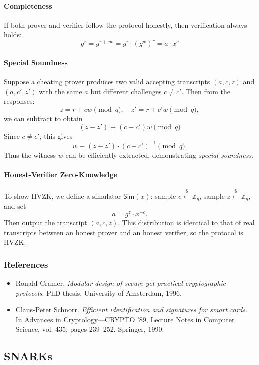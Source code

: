 \paragraph{Completeness}
If both prover and verifier follow the protocol honestly, then verification always holds:
\[
g^z = g^{r + cw} = g^r \cdot (g^w)^c = a \cdot x^c
\]

\paragraph{Special Soundness}
Suppose a cheating prover produces two valid accepting transcripts 
\((a,c,z)\) and \((a,c',z')\) with the same $a$ but different challenges $c \neq c'$.  
Then from the responses:
\[
z = r + cw \pmod{q}, \quad z' = r + c'w \pmod{q},
\]
we can subtract to obtain
\[
(z - z') \equiv (c - c')w \pmod{q}
\]
Since $c \neq c'$, this gives
\[
w \equiv (z - z') \cdot (c - c')^{-1} \pmod{q}.
\]
Thus the witness $w$ can be efficiently extracted, demonstrating \emph{special soundness}.

\paragraph{Honest-Verifier Zero-Knowledge}
To show HVZK, we define a simulator $\mathsf{Sim}(x)$:  
sample $c \stackrel{\$}{\leftarrow} \mathbb{Z}_q$, sample $z \stackrel{\$}{\leftarrow} \mathbb{Z}_q$, and set
\[
a = g^z \cdot x^{-c}.
\]
Then output the transcript $(a,c,z)$.  
This distribution is identical to that of real transcripts between an honest prover and an honest verifier, 
so the protocol is HVZK.

\subsubsection*{References}
\begin{itemize}
  \item Ronald Cramer. \emph{Modular design of secure yet practical cryptographic protocols}. 
  PhD thesis, University of Amsterdam, 1996.
  \item Claus-Peter Schnorr. \emph{Efficient identification and signatures for smart cards}. 
  In Advances in Cryptology—CRYPTO '89, Lecture Notes in Computer Science, vol. 435, 
  pages 239--252. Springer, 1990.
\end{itemize}

\subsection{SNARKs}

